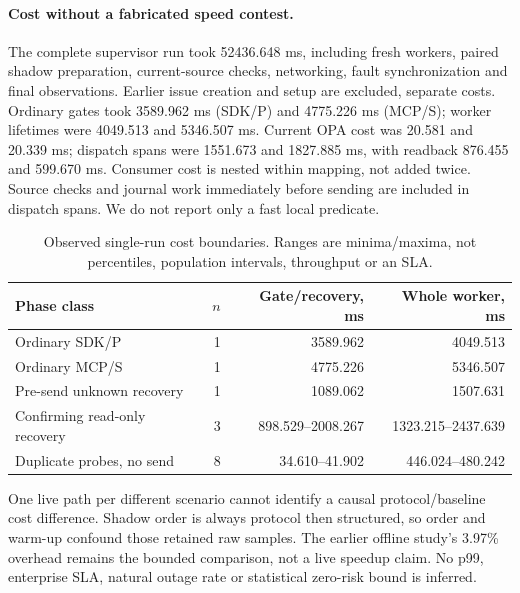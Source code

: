 \documentclass[11pt,letterpaper]{article}
\begin{document}
\paragraph{Cost without a fabricated speed contest.}
The complete supervisor run took 52436.648 ms, including fresh workers, paired
shadow preparation, current-source checks, networking, fault synchronization and
final observations. Earlier issue creation and setup are excluded, separate
costs. Ordinary gates took 3589.962 ms (SDK/P) and 4775.226 ms
(MCP/S); worker lifetimes were 4049.513 and 5346.507 ms. Current OPA cost was
20.581 and 20.339 ms; dispatch spans were 1551.673 and 1827.885 ms, with readback
876.455 and 599.670 ms. Consumer cost is nested within mapping, not added twice.
Source checks and journal work immediately before sending are included in
dispatch spans. We do not report only a fast local predicate.

\begin{table}[tbp]
\centering\small
\begin{tabular}{@{}lrrr@{}}
\toprule Phase class & $n$ & Gate/recovery, ms & Whole worker, ms \\ \midrule
Ordinary SDK/P & 1 & 3589.962 & 4049.513 \\
Ordinary MCP/S & 1 & 4775.226 & 5346.507 \\
Pre-send unknown recovery & 1 & 1089.062 & 1507.631 \\
Confirming read-only recovery & 3 & 898.529--2008.267 & 1323.215--2437.639 \\
Duplicate probes, no send & 8 & 34.610--41.902 & 446.024--480.242 \\
\bottomrule
\end{tabular}
\caption{Observed single-run cost boundaries. Ranges are minima/maxima,
not percentiles, population intervals, throughput or an SLA.}
\label{tab:owned-cost}
\end{table}

One live path per different scenario cannot identify a causal protocol/baseline
cost difference. Shadow order is always protocol then structured, so order and
warm-up confound those retained raw samples. The earlier offline study's 3.97\%
overhead remains the bounded comparison, not a live speedup claim. No p99,
enterprise SLA, natural outage rate or statistical zero-risk bound is inferred.
\end{document}

